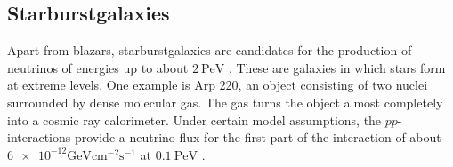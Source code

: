 \subsection{Starburstgalaxies}

Apart from blazars, starburstgalaxies are candidates for the production of neutrinos of energies up to about $\SI{2}{\peta\electronvolt}$ \cite{starburst2}.
These are galaxies in which stars form at extreme levels.
One example is Arp 220, an object consisting of two nuclei surrounded by dense molecular gas.
The gas turns the object almost completely into a cosmic ray calorimeter.
Under certain model assumptions, the $pp$-interactions provide a neutrino flux for the first part of the interaction of about $\num{6e-12}\si{\giga\electronvolt\centi\meter\tothe{-2}\second\tothe{-1}}$ at $\SI{0.1}{\peta\electronvolt}$ \cite{starburst}.
